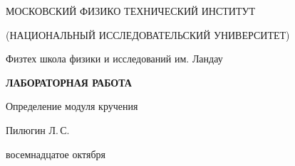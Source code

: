 
\begin{center}
    {
        \MakeUppercase{Московский физико технический институт}

        \MakeUppercase{(Национальный исследовательский университет)}
    }

    {
        Физтех школа физики и исследований им. Ландау
    }
    
    \vspace{200pt}
    {
        \Huge
        \bfseries
        \MakeUppercase{Лабораторная работа}
    }

    \vspace{24pt}
    {
        \Large
        Определение модуля кручения
    }

    \vspace{24pt}
    {
        \large
        Пилюгин Л.\,С.
    }

    \vspace{2pt}
    {
        \large
        восемнадцатое октября
    }
\end{center}

\newpage
{} 
\setcounter{page}{2}
\renewcommand\thesection{\Roman{section}}
\renewcommand\thesubsection{\Roman{subsection}}
